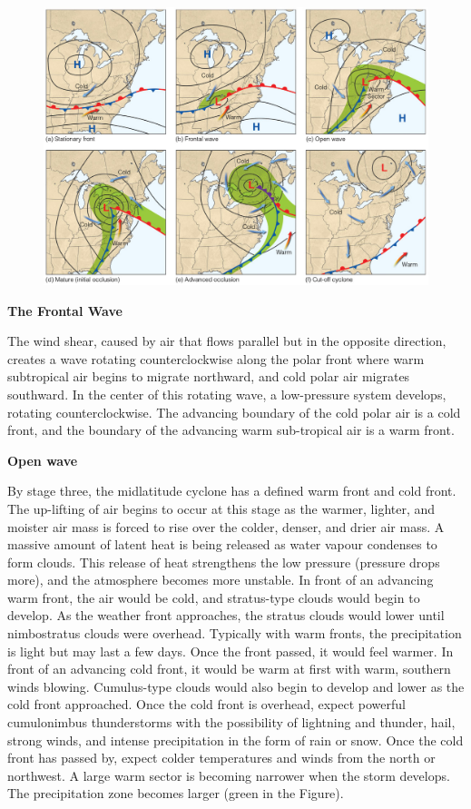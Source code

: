 \documentclass[12pt,oneside]{book}
\begin{document}
\begin{figure}

{\centering \includegraphics[width=0.8\linewidth]{figures/Figure631} 

}

\caption{ }\label{fig:Fig631}
\end{figure}

\textbf{The Frontal Wave}

The wind shear, caused by air that flows parallel but in the opposite
direction, creates a wave rotating counterclockwise along the polar
front where warm subtropical air begins to migrate northward, and cold
polar air migrates southward. In the center of this rotating wave, a
low-pressure system develops, rotating counterclockwise. The advancing
boundary of the cold polar air is a cold front, and the boundary of the
advancing warm sub-tropical air is a warm front.

\textbf{Open wave}

By stage three, the midlatitude cyclone has a defined warm front and
cold front. The up-lifting of air begins to occur at this stage as the
warmer, lighter, and moister air mass is forced to rise over the colder,
denser, and drier air mass. A massive amount of latent heat is being
released as water vapour condenses to form clouds. This release of heat
strengthens the low pressure (pressure drops more), and the atmosphere
becomes more unstable. In front of an advancing warm front, the air
would be cold, and stratus-type clouds would begin to develop. As the
weather front approaches, the stratus clouds would lower until
nimbostratus clouds were overhead. Typically with warm fronts, the
precipitation is light but may last a few days. Once the front passed,
it would feel warmer. In front of an advancing cold front, it would be
warm at first with warm, southern winds blowing. Cumulus-type clouds
would also begin to develop and lower as the cold front approached. Once
the cold front is overhead, expect powerful cumulonimbus thunderstorms
with the possibility of lightning and thunder, hail, strong winds, and
intense precipitation in the form of rain or snow. Once the cold front
has passed by, expect colder temperatures and winds from the north or
northwest. A large warm sector is becoming narrower when the storm
develops. The precipitation zone becomes larger (green in the Figure).
\end{document}
